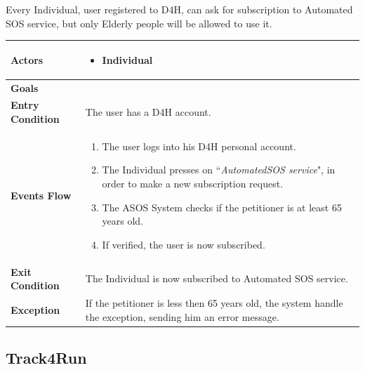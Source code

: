             Every Individual, user registered to D4H, can ask for subscription to Automated SOS service, but only Elderly people will be allowed to use it.
            
            \begin{table}[H]
            	\centering
                
                \begin{tabular}{|p{3cm}|p{8.2cm}|}
                    \hline
                    \textbf{Actors} & \begin{itemize}
                        \item Individual
                    \end{itemize} \\
                     \hline
                    \textbf{Goals} & \\ 
                     \hline
                    \textbf{Entry Condition} & The user has a D4H account. \\
                     \hline
                    \textbf{Events Flow} & \begin{enumerate}
                                               \item The user logs into his D4H personal account.
                                               \item The Individual presses on
                                               ``\emph{AutomatedSOS service}", in order to make a new subscription request.
                                               \item The ASOS System checks if the petitioner is at least 65 years old.
                                               \item If verified, the user is now subscribed.
                                           \end{enumerate}\\
                     \hline
                    \textbf{Exit Condition} & The Individual is now subscribed to Automated SOS service.\\
                     \hline
                    \textbf{Exception} & If the petitioner is less then 65 years old, the system handle the exception, sending him an error message. \\
                     \hline
                \end{tabular}  
            \end{table} 
            
            
    \subsection{Track4Run}
            
